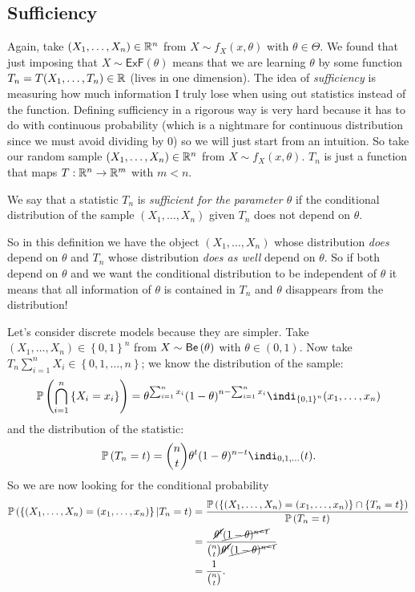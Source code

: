 \documentclass[12pt]{report}
\begin{document}
\subsection{Sufficiency}
Again, take $(X_{1},\ldots,X_{n})\in\mathbb{R}^{n}$ from $X\sim f_{X}(x,\theta)$ with $\theta\in\Theta$. We found that just imposing that $X\sim\mathsf{ExF}(\theta)$ means that we are learning $\theta$ by some function $T_{n}=T(X_{1},\ldots,T_{n})\in\mathbb{R}$ (lives in one dimension). The idea of \emph{sufficiency} is measuring how much information I truly lose when using out statistics instead of the function. Defining sufficiency in a rigorous way is very hard because it has to do with continuous probability (which is a nightmare for continuous distribution since we must avoid dividing by 0) so we will just start from an intuition. So take our random sample $(X_{1},\ldots,X_{n})\in\mathbb{R}^{n}$ from $X\sim f_{X}(x,\theta)$. $T_{n}$ is just a function that maps $T:\mathbb{R}^{n}\to\mathbb{R}^{m}$ with $m<n$. 
\begin{definition}
	We say that a statistic $T_{n}$ is \emph{sufficient for the parameter $\theta$} if the conditional distribution of the sample $(X_{1},\ldots,X_{n})$ given $T_{n}$ does not depend on $\theta$.
\end{definition}
So in this definition we have the object $(X_{1},\ldots,X_{n})$ whose distribution \textit{does} depend on $\theta$ and $T_{n}$ whose distribution \textit{does as well} depend on $\theta$. So if both depend on $\theta$ and we want the conditional distribution to be independent of $\theta$ it means that all information of $\theta$ is contained in $T_{n}$ and $\theta$ disappears from the distribution!\par
Let's consider discrete models because they are simpler. Take $(X_{1},\ldots,X_{n})\in\left\{0,1\right\}^{n}$ from $X\sim\mathsf{Be}\left(\theta\right)$ with $\theta\in(0,1)$. Now take $T_{n}\sum_{i=1}^{n}X_{i}\in\left\{0,1,\ldots,n\right\}$; we know the distribution of the sample:
\begin{equation*}
	\pr\left(\bigcap_{i=1}^{n}\left\{X_{i}=x_{i}\right\}\right)=\theta^{\sum_{i=1}^{n}x_{i}}(1-\theta)^{n-\sum_{i=1}^{n}x_{i}}\indi_{\left\{0,1\right\}^{n}}(x_{1},\ldots,x_{n})
\end{equation*}
and the distribution of the statistic:
\begin{equation*}
	\pr\left(T_{n}=t\right)= {n\choose t}\theta^{t}(1-\theta)^{n-t}\indi_{0,1,\ldots}(t).
\end{equation*}
So we are now looking for the conditional probability
\begin{align*}
	\mathbb{P}\left(\left\{(X_{1},\ldots,X_{n})=(x_{1},\ldots,x_{n})\right\}|T_{n}=t\right)&=\frac{\mathbb{P}\left(\left\{(X_{1},\ldots,X_{n})=(x_{1},\ldots,x_{n})\right\}\cap\left\{T_{n}=t\right\}\right)}{\mathbb{P}\left(T_{n}=t\right)}\\
	&=\frac{\cancel{\theta^{t}}\cancel{(1-\theta)^{n-t}}}{{n\choose t}\cancel{\theta^{t}}\cancel{(1-\theta)^{n-t}}}\\
	&=\frac{1}{{n\choose t}}.
\end{align*}
\end{document}
